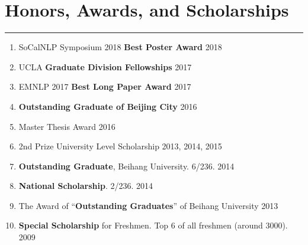 \documentclass[11pt, a4paper]{article}
\newcommand{\hr}{\hrule\vspace{0.5em}}
\begin{document}
\section*{Honors, Awards, and Scholarships}
\hr
\begin{enumerate}
\item SoCalNLP Symposium 2018 \textbf{Best Poster Award} \hfill 2018
\item UCLA \textbf{Graduate Division Fellowships} \hfill 2017
\item EMNLP 2017 \textbf{Best Long Paper Award} \hfill 2017
\item \textbf{Outstanding Graduate of Beijing City} \hfill 2016
\item Master Thesis Award \hfill 2016
\item 2nd Prize University Level Scholarship \hfill 2013, 2014, 2015
\item \textbf{Outstanding Graduate}, Beihang University. 6/236.	 \hfill 2014
\item \textbf{National Scholarship}. 2/236. \hfill 2014
\item The Award of ``\textbf{Outstanding Graduates}'' of Beihang University \hfill 2013
\item \textbf{Special Scholarship} for Freshmen. Top 6 of all freshmen (around 3000). \hfill 2009

\end{enumerate}
\end{document}
